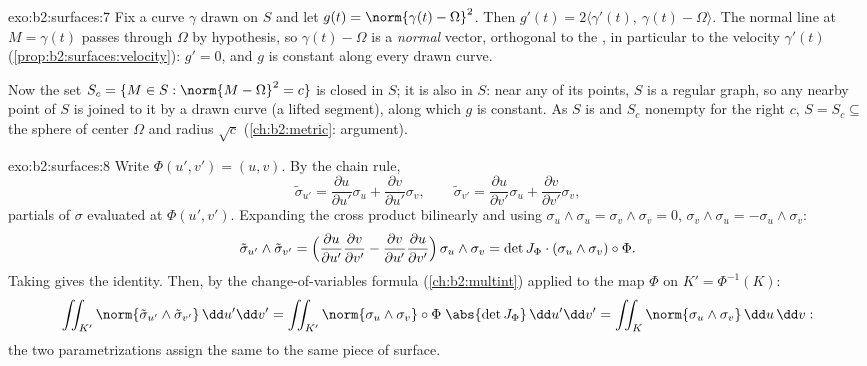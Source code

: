 \begin{solution}{exo:b2:surfaces:7}
Fix a curve $\gamma$ drawn on $S$ and let $g(t) = \norm{\gamma(t)
- \Omega}^2$. Then $g'(t) = 2\langle \gamma'(t),\ \gamma(t) -
\Omega\rangle$. The normal line at $M = \gamma(t)$ passes through
$\Omega$ by hypothesis, so $\gamma(t) - \Omega$ is a \emph{normal}
vector, orthogonal to the , in particular to the
velocity $\gamma'(t)$ (\cref{prop:b2:surfaces:velocity}): $g' =
0$, and $g$ is constant along every drawn curve.

Now the set $S_c = \{M \in S : \norm{M - \Omega}^2 = c\}$ is
closed in $S$; it is also  in $S$: near any of its points, $S$
is a regular graph, so any nearby point of $S$ is joined to it by
a drawn curve (a lifted segment), along which $g$ is constant. As
$S$ is  and $S_c$ nonempty for the right $c$, $S = S_c
\subseteq$ the sphere of center $\Omega$ and radius $\sqrt c$
(\cref{ch:b2:metric}:  argument).
\end{solution}

\begin{solution}{exo:b2:surfaces:8}
Write $\Phi(u', v') = (u, v)$. By the chain rule,
\[
\tilde\sigma_{u'} = \frac{\partial u}{\partial u'}\sigma_u
+ \frac{\partial v}{\partial u'}\sigma_v,
\qquad
\tilde\sigma_{v'} = \frac{\partial u}{\partial v'}\sigma_u
+ \frac{\partial v}{\partial v'}\sigma_v ,
\]
partials of $\sigma$ evaluated at $\Phi(u',v')$. Expanding the
cross product bilinearly and using $\sigma_u \wedge \sigma_u =
\sigma_v \wedge \sigma_v = 0$, $\sigma_v \wedge \sigma_u =
-\sigma_u \wedge \sigma_v$:
\[
\tilde\sigma_{u'} \wedge \tilde\sigma_{v'}
= \Bigl(\frac{\partial u}{\partial u'}
\frac{\partial v}{\partial v'}
- \frac{\partial v}{\partial u'}
\frac{\partial u}{\partial v'}\Bigr)\,
\sigma_u \wedge \sigma_v
= \det J_\Phi \cdot (\sigma_u \wedge \sigma_v)\circ\Phi .
\]
Taking  gives the identity. Then, by the change-of-variables
formula (\cref{ch:b2:multint}) applied to the map $\Phi$ on $K' =
\Phi^{-1}(K)$:
\[
\iint_{K'} \norm{\tilde\sigma_{u'} \wedge \tilde\sigma_{v'}}
\,\dd u'\dd v'
= \iint_{K'} \norm{\sigma_u \wedge \sigma_v}\circ\Phi\;
\abs{\det J_\Phi}\,\dd u'\dd v'
= \iint_K \norm{\sigma_u \wedge \sigma_v}\,\dd u\,\dd v :
\]
the two parametrizations assign the same  to the same piece of
surface.
\end{solution}

